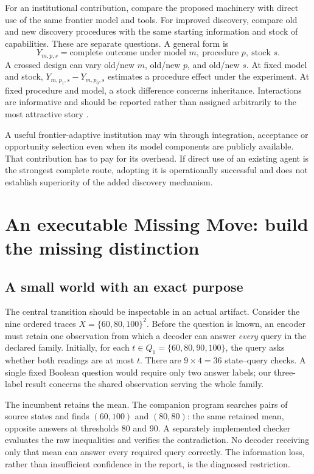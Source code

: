 For an institutional contribution, compare the proposed machinery with direct use of the same frontier model and tools. For improved discovery, compare old and new discovery procedures with the same starting information and stock of capabilities. These are separate questions. A general form is
\begin{equation}
Y_{m,p,s}=\text{complete outcome under model }m,\ \text{procedure }p,\ \text{stock }s.
\end{equation}
A crossed design can vary old/new $m$, old/new $p$, and old/new $s$. At fixed model and stock, $Y_{m,p_1,s}-Y_{m,p_0,s}$ estimates a procedure effect under the experiment. At fixed procedure and model, a stock difference concerns inheritance. Interactions are informative and should be reported rather than assigned arbitrarily to the most attractive story \citep[\S12]{boucher_genesis}.

A useful frontier-adaptive institution may win through integration, acceptance or opportunity selection even when its model components are publicly available. That contribution has to pay for its overhead. If direct use of an existing agent is the strongest complete route, adopting it is operationally successful and does not establish superiority of the added discovery mechanism.

\section{An executable Missing Move: build the missing distinction}
\label{sec:construction}
\subsection{A small world with an exact purpose}
The central transition should be inspectable in an actual artifact. Consider the nine ordered traces $X=\{60,80,100\}^{2}$. Before the question is known, an encoder must retain one observation from which a decoder can answer \emph{every} query in the declared family. Initially, for each $t\in Q_1=\{60,80,90,100\}$, the query asks whether both readings are at most $t$. There are $9\times4=36$ state--query checks. A single fixed Boolean question would require only two answer labels; our three-label result concerns the shared observation serving the whole family.

The incumbent retains the mean. The companion program searches pairs of source states and finds $(60,100)$ and $(80,80)$: the same retained mean, opposite answers at thresholds 80 and 90. A separately implemented checker evaluates the raw inequalities and verifies the contradiction. No decoder receiving only that mean can answer every required query correctly. The information loss, rather than insufficient confidence in the report, is the diagnosed restriction.

